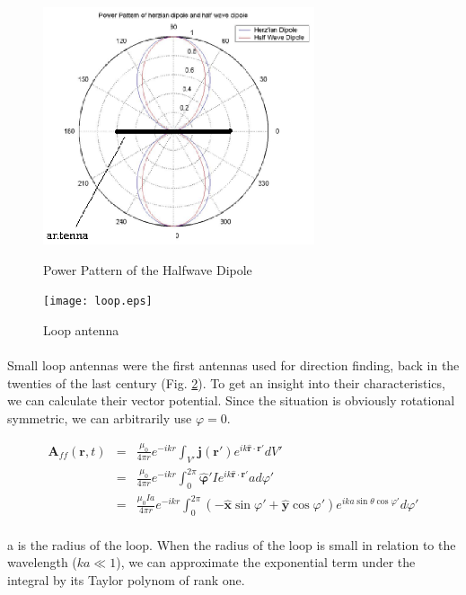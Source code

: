 \documentclass[a4paper,10pt]{thesis}
\begin{document}
\begin{figure}
 \begin{center}
 \includegraphics[width=8cm]{pp_shd}\\
  \caption{Power Pattern of the Halfwave Dipole}\label{fig_pp_shd}
  \end{center}
\end{figure}

\begin{figure}
  \texttt{[image: loop.eps]}\\
  \caption{Loop antenna}\label{fig_loop}
\end{figure}
\paragraph*{}
Small loop antennas were the first antennas used for direction finding, back in the twenties of the last century (Fig. \ref{fig_loop}). To get an insight into their characteristics, we can calculate their vector potential. Since the situation is obviously rotational symmetric, we can arbitrarily use $\varphi=0$.

\begin{eqnarray}\label{A_loop}
 \mathbf{A}_{ff}(\mathbf{r},t) &=& \frac{\mu_0}{4 \pi r} e^{-ikr} \int_{V'} \mathbf{j}(\mathbf{r}') e^{ik \mathbf{\hat{r}} \cdot \mathbf{r}' } dV' \\
&=& \frac{\mu_0}{4 \pi r} e^{-ikr} \int_{0}^{2\pi}\mathbf{ \hat{\varphi}'} I e^{ik \mathbf{\hat{r}} \cdot \mathbf{r}' } a d\varphi' \nonumber \\
&=& \frac{\mu_0 I a}{4 \pi r} e^{-ikr} \int_{0}^{2\pi} (-\mathbf{\hat{x}}\sin \varphi ' + \mathbf{\hat{y}} \cos \varphi ') e^{ik a\sin \theta \cos \varphi' }  d\varphi' \nonumber
\end{eqnarray}

\paragraph*{}
a is the radius of the loop. When the radius of the loop is small in relation to the wavelength ($ka\ll 1$), we can approximate the exponential term under the integral by its Taylor polynom of rank one.
\end{document}
